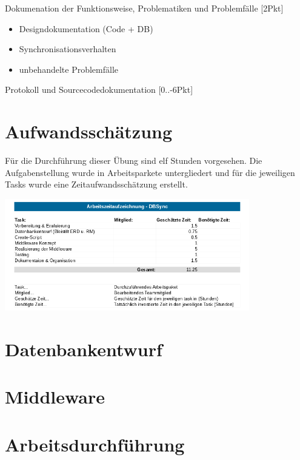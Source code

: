\documentclass[a4paper]{article}
\begin{document}
	Dokumenation der Funktionsweise, Problematiken und Problemfälle [2Pkt]
	\begin{itemize}
		\item Designdokumentation (Code + DB)
		\item Synchronisationsverhalten
		\item unbehandelte Problemfälle\\
	\end{itemize}
	
	Protokoll und Sourcecodedokumentation [0..-6Pkt]
	
	\newpage
	\section{Aufwandsschätzung}
	Für die Durchführung dieser Übung sind elf Stunden vorgesehen.
	Die Aufgabenstellung wurde in Arbeitsparkete untergliedert und für die jeweiligen Tasks wurde eine Zeitaufwandsschätzung erstellt.\\
	\begin{center}
		\includegraphics[width=0.8\textwidth]{img/timetable.png}
	\end{center}
	
	\section{Datenbankentwurf}
	\section{Middleware}
	\section{Arbeitsdurchführung}
\end{document}
